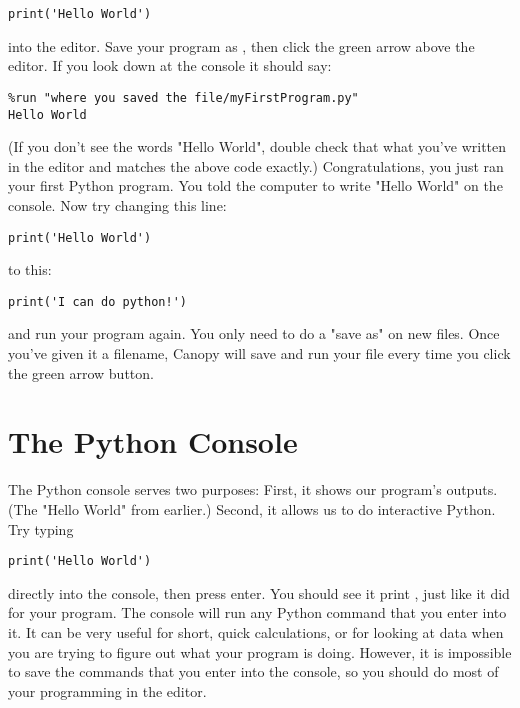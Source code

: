 \begin{Verbatim}
print('Hello World')
\end{Verbatim}

into the editor. Save your program as , then click the green
arrow above the editor. If you look down at the console it should say:

\begin{Verbatim}
%run "where you saved the file/myFirstProgram.py"
Hello World
\end{Verbatim}
(If you don't see the words "Hello World", double check that what you've written in the editor and matches the above code exactly.) Congratulations, you just ran your first Python program. You told the computer to write "Hello World" on the console.
Now try changing this line:
\begin{Verbatim}
print('Hello World')
\end{Verbatim}
to this:
\begin{Verbatim}
print('I can do python!')
\end{Verbatim}
and run your program again. You only need to do a "save as" on new files. Once you've given it a filename, Canopy will save and run your file every time you click the green arrow button.
\section{The Python Console}
The Python console serves two purposes: First, it shows our program's outputs. (The "Hello World" from earlier.) Second, it allows us to do interactive Python. Try typing
\begin{Verbatim}
print('Hello World')
\end{Verbatim}
directly into the console, then press enter.
You should see it print , just like it did for your program. The
console will run any Python command that you enter into it. It can be very useful for short, quick calculations, or for looking at data when you are trying to figure out what your program is doing. However, it is impossible to save the commands that you enter into the console, so you should do most of your programming in the editor.
